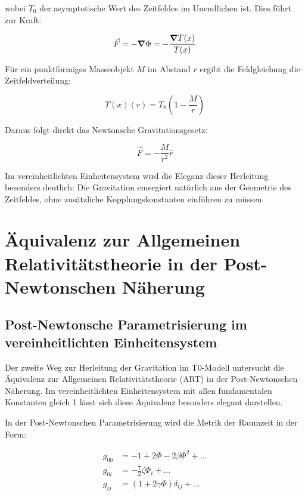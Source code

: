 \documentclass[12pt,a4paper]{article}
\newcommand{\Tfield}{T(x)}
\newcommand{\Tzero}{T_0}
\begin{document}
	wobei \(\Tzero\) der asymptotische Wert des Zeitfeldes im Unendlichen ist. Dies führt zur Kraft:
	
	\begin{equation}
		\vec{F} = -\grad \Phi = -\frac{\grad \Tfield}{\Tfield}
	\end{equation}
	
	Für ein punktförmiges Masseobjekt \(M\) im Abstand \(r\) ergibt die Feldgleichung die Zeitfeldverteilung:
	
	\begin{equation}
		\Tfield(r) = \Tzero\left(1 - \frac{M}{r}\right)
	\end{equation}
	
	Daraus folgt direkt das Newtonsche Gravitationsgesetz:
	
	\begin{equation}
		\vec{F} = -\frac{M}{r^2} \hat{r}
	\end{equation}
	
	Im vereinheitlichten Einheitensystem wird die Eleganz dieser Herleitung besonders deutlich: Die Gravitation emergiert natürlich aus der Geometrie des Zeitfeldes, ohne zusätzliche Kopplungskonstanten einführen zu müssen.
	
	\section{Äquivalenz zur Allgemeinen Relativitätstheorie in der Post-Newtonschen Näherung}
	
	\subsection{Post-Newtonsche Parametrisierung im vereinheitlichten Einheitensystem}
	
	Der zweite Weg zur Herleitung der Gravitation im T0-Modell untersucht die Äquivalenz zur Allgemeinen Relativitätstheorie (ART) in der Post-Newtonschen Näherung. Im vereinheitlichten Einheitensystem mit allen fundamentalen Konstanten gleich 1 lässt sich diese Äquivalenz besonders elegant darstellen.
	
	In der Post-Newtonschen Parametrisierung wird die Metrik der Raumzeit in der Form:
	
	\begin{align}
		g_{00} &= -1 + 2\Phi - 2\beta\Phi^2 + \dots \\
		g_{0i} &= -\frac{7}{2}\zeta \Phi_i + \dots \\
		g_{ij} &= (1 + 2\gamma\Phi)\delta_{ij} + \dots
	\end{align}
	
\end{document}
